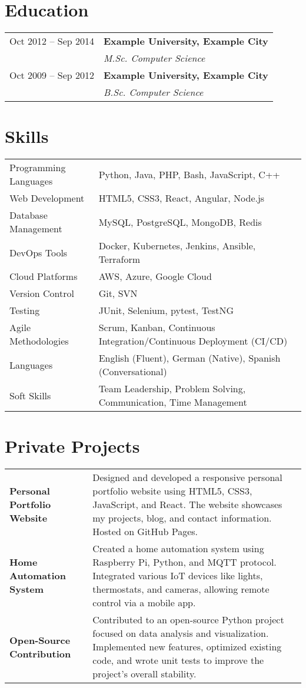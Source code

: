 \documentclass{scrartcl}
\newcommand{\leftcolsize}{4cm}
\newcommand{\educationitem}[3]{%
    #1 & \textbf{#2} \\
       & \textit{#3} \\
}
\newcommand{\cvblock}[2]{
    \section*{#1}
    \begin{tabularx}{\textwidth}[ht]{>{\raggedleft}p{\leftcolsize}|X}
    		#2
    \end{tabularx}
    \vspace{0.5em}   
}
\newcommand{\cvblockitem}[2]{
    #1 & #2 \\
}
\newcommand{\privateprojects}[1]{
    \section*{Private Projects}
    \begin{tabularx}{\textwidth}[ht]{>{\raggedleft}p{\leftcolsize}|X}
       #1
    \end{tabularx}
    \vspace{0.5em} %
    \ifthenelse{\isundefined{\github}}{}{\textbf{GitHub:} \github}
}
\newcommand{\projectitem}[2]{
     #1 & {#2} \\
}
\begin{document}
\cvblock{Education}{
    \educationitem{Oct 2012 -- Sep 2014}{Example University, Example City}{M.Sc. Computer Science}
    \educationitem{Oct 2009 -- Sep 2012}{Example University, Example City}{B.Sc. Computer Science}
}

\cvblock{Skills}{
    \cvblockitem{Programming Languages}{Python, Java, PHP, Bash, JavaScript, C++}
    \cvblockitem{Web Development}{HTML5, CSS3, React, Angular, Node.js}
    \cvblockitem{Database Management}{MySQL, PostgreSQL, MongoDB, Redis}
    \cvblockitem{DevOps Tools}{Docker, Kubernetes, Jenkins, Ansible, Terraform}
    \cvblockitem{Cloud Platforms}{AWS, Azure, Google Cloud}
    \cvblockitem{Version Control}{Git, SVN}
    \cvblockitem{Testing}{JUnit, Selenium, pytest, TestNG}
    \cvblockitem{Agile Methodologies}{Scrum, Kanban, Continuous Integration/Continuous Deployment (CI/CD)}
    \cvblockitem{Languages}{English (Fluent), German (Native), Spanish (Conversational)}
    \cvblockitem{Soft Skills}{Team Leadership, Problem Solving, Communication, Time Management}
}

\privateprojects{
    \projectitem{\textbf{Personal Portfolio Website}}{Designed and developed a responsive personal portfolio website using HTML5, CSS3, JavaScript, and React. The website showcases my projects, blog, and contact information. Hosted on GitHub Pages.}
    \projectitem{\textbf{Home Automation System}}{Created a home automation system using Raspberry Pi, Python, and MQTT protocol. Integrated various IoT devices like lights, thermostats, and cameras, allowing remote control via a mobile app.}
    \projectitem{\textbf{Open-Source Contribution}}{Contributed to an open-source Python project focused on data analysis and visualization. Implemented new features, optimized existing code, and wrote unit tests to improve the project's overall stability.}
}
\end{document}
